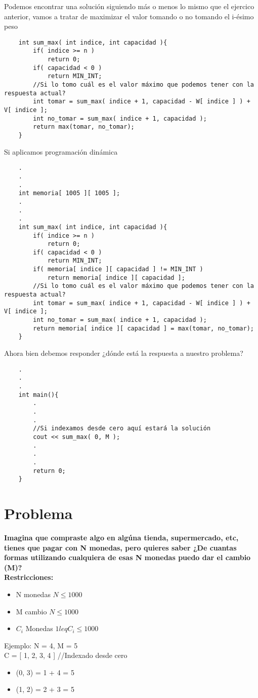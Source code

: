 Podemos encontrar una solución siguiendo más o menos lo mismo que el ejercico anterior, vamos a tratar de maximizar el valor tomando o no tomando el i-ésimo peso 

\begin{lstlisting}
    int sum_max( int indice, int capacidad ){
        if( indice >= n )
            return 0;
        if( capacidad < 0 )
            return MIN_INT;
        //Si lo tomo cuál es el valor máximo que podemos tener con la respuesta actual?
        int tomar = sum_max( indice + 1, capacidad - W[ indice ] ) + V[ indice ];
        int no_tomar = sum_max( indice + 1, capacidad );
        return max(tomar, no_tomar);
    }
\end{lstlisting}

Si aplicamos programación dinámica
\begin{lstlisting}
    .
    .
    .
    int memoria[ 1005 ][ 1005 ];
    .
    .
    .
    int sum_max( int indice, int capacidad ){
        if( indice >= n )
            return 0;
        if( capacidad < 0 )
            return MIN_INT;
        if( memoria[ indice ][ capacidad ] != MIN_INT )
            return memoria[ indice ][ capacidad ];
        //Si lo tomo cuál es el valor máximo que podemos tener con la respuesta actual?
        int tomar = sum_max( indice + 1, capacidad - W[ indice ] ) + V[ indice ];
        int no_tomar = sum_max( indice + 1, capacidad );
        return memoria[ indice ][ capacidad ] = max(tomar, no_tomar);
    }
\end{lstlisting}

Ahora bien debemos responder ¿dónde está la respuesta a nuestro problema?

\begin{lstlisting}
    .
    .
    .
    int main(){
        .
        .
        .
        //Si indexamos desde cero aquí estará la solución
        cout << sum_max( 0, M );
        .
        .
        .
        return 0;
    }
\end{lstlisting}

\section{Problema}
\textbf{Imagina que compraste algo en algúna tienda, supermercado, etc, tienes que pagar con N monedas, pero quieres saber ¿De cuantas formas utilizando cualquiera de esas N monedas puedo dar el cambio (M)?\\}
\textbf{Restricciones: }
\begin{itemize}
    \item N monedas $N \leq 1000$
    \item M cambio $N \leq 1000$
    \item $C_{i}$ Monedas $1 leq C_{i} \leq 1000$
\end{itemize}
Ejemplo:
N = 4, M = 5\\
C = [ 1, 2, 3, 4 ] //Indexado desde cero \\
\begin{itemize}
    \item { (0, 3) = 1 + 4 = 5 }
    \item { (1, 2) = 2 + 3 = 5 }
\end{itemize}

